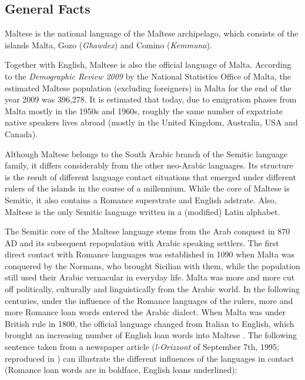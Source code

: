 \clearpage


\begin{multicols}{2}

\subsection{General Facts}

Maltese is the national language of the Maltese archipelago, which consists of the islands Malta, Gozo (\emph{Għawdex}) and Comino (\emph{Kemmuna}).

Together with English, Maltese is also the official language of Malta. According to the \emph{Demographic Review 2009} by the National Statistics Office of Malta, the estimated Maltese population (excluding foreigners) in Malta for the end of the year 2009 was 396,278. It is estimated that today, due to emigration phases from Malta mostly in the 1950s and 1960s, roughly the same number of expatriate native speakers lives abroad (mostly in the United Kingdom, Australia, USA and Canada).

Although Maltese belongs to the South Arabic branch of the Semitic language family, it differs considerably from the other neo-Arabic languages. Its structure is the result of different language contact situations that emerged under different rulers of the islands in the course of a millennium. While the core of Maltese is Semitic, it also contains a Romance superstrate and English adstrate. Also, Maltese is the only Semitic language written in a (modified) Latin alphabet.

The Semitic core of the Maltese language stems from the Arab conquest in 870 AD and its subsequent repopulation with Arabic speaking settlers. The first direct contact with Romance languages was established in 1090 when Malta was conquered by the Normans, who brought Sicilian with them, while the population still used their Arabic vernacular in everyday life. Malta was more and more cut off politically, culturally and linguistically from the Arabic world. In the following centuries, under the influence of the Romance languages of the rulers, more and more Romance loan words entered the Arabic dialect. When Malta was under British rule in 1800, the official language changed from Italian to English, which brought an increasing number of English loan words into Maltese . The following sentence taken from a newspaper article (\emph{l-Orizzont} of September 7th, 1995; reproduced in \cite[p.~135]{Ambros:1998}) can illustrate the different influences of the languages in contact (Romance loan words are in boldface, English loans underlined):


\end{multicols}
